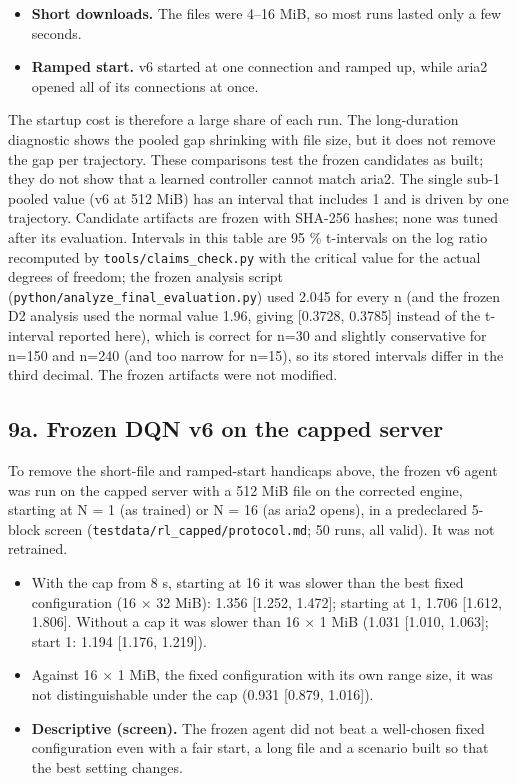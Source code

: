 \documentclass[10pt,a4paper]{article}
\begin{document}
\begin{itemize}
\item \textbf{Short downloads.} The files were 4–16 MiB, so most runs lasted only a few seconds.
\item \textbf{Ramped start.} v6 started at one connection and ramped up, while aria2 opened all of its connections at once.
\end{itemize}

The startup cost is therefore a large share of each run. The long-duration diagnostic shows the pooled gap shrinking with file size, but it does not remove the gap per trajectory. These comparisons test the frozen candidates as built; they do not show that a learned controller cannot match aria2. The single sub-1 pooled value (v6 at 512 MiB) has an interval that includes 1 and is driven by one trajectory. Candidate artifacts are frozen with SHA-256 hashes; none was tuned after its evaluation. Intervals in this table are 95 \% t-intervals on the log ratio recomputed by \texttt{tools/\allowbreak{}claims\_check.py} with the critical value for the actual degrees of freedom; the frozen analysis script (\texttt{python/\allowbreak{}analyze\_final\_evaluation.py}) used 2.045 for every n (and the frozen D2 analysis used the normal value 1.96, giving [0.3728, 0.3785] instead of the t-interval reported here), which is correct for n=30 and slightly conservative for n=150 and n=240 (and too narrow for n=15), so its stored intervals differ in the third decimal. The frozen artifacts were not modified.


\subsection*{9a. Frozen DQN v6 on the capped server}

To remove the short-file and ramped-start handicaps above, the frozen v6 agent was run on the capped server with a 512 MiB file on the corrected engine, starting at N = 1 (as trained) or N = 16 (as aria2 opens), in a predeclared 5-block screen (\texttt{testdata/\allowbreak{}rl\_capped/\allowbreak{}protocol.md}; 50 runs, all valid). It was not retrained.


\begin{itemize}
\item With the cap from 8 s, starting at 16 it was slower than the best fixed configuration (16 × 32 MiB): 1.356 [1.252, 1.472]; starting at 1, 1.706 [1.612, 1.806]. Without a cap it was slower than 16 × 1 MiB (1.031 [1.010, 1.063]; start 1: 1.194 [1.176, 1.219]).
\item Against 16 × 1 MiB, the fixed configuration with its own range size, it was not distinguishable under the cap (0.931 [0.879, 1.016]).
\item \textbf{Descriptive (screen).} The frozen agent did not beat a well-chosen fixed configuration even with a fair start, a long file and a scenario built so that the best setting changes.
\end{itemize}
\end{document}

